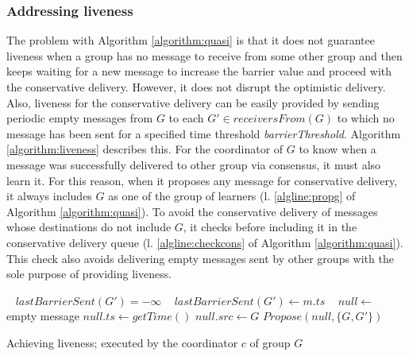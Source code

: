 \documentclass[times, 10pt]{article}
\begin{document}
\subsubsection{Addressing liveness}

The problem with Algorithm \ref{algorithm:quasi} is that it does not guarantee liveness when a group has no message to receive from some other group and then keeps waiting for a new message to increase the barrier value and proceed with the conservative delivery. However, it does not disrupt the optimistic delivery. Also, liveness for the conservative delivery can be easily provided by sending periodic empty messages from $G$ to each $G' \in receiversFrom(G)$ to which no message has been sent for a specified time threshold \textit{barrierThreshold}. Algorithm \ref{algorithm:liveness} describes this. For the coordinator of $G$ to know when a message was successfully delivered to other group via consensus, it must also learn it. For this reason, when it proposes any message for conservative delivery, it always includes $G$ as one of the group of learners (l. \ref{algline:propg} of Algorithm \ref{algorithm:quasi}). To avoid the conservative delivery of messages whose destinations do not include $G$, it checks before including it in the conservative delivery queue (l. \ref{algline:checkcons} of Algorithm \ref{algorithm:quasi}). This check also avoids delivering empty messages sent by other groups with the sole purpose of providing liveness.

\begin{algorithm}
\begin{distribalgo}[1]
\blankline\
    \STATE $lastBarrierSent(G') = -\infty$
  \ENDINDENT
\ENDINDENT
\blankline\
    \STATE $lastBarrierSent(G') \leftarrow m.ts$
  \ENDINDENT
\ENDINDENT
\blankline\
  \STATE $null \leftarrow$ empty message
  \STATE $null.ts \leftarrow getTime()$
  \STATE $null.src \leftarrow G$
  \STATE $Propose(null, \{G,G'\})$
\ENDINDENT
\blankline\

\caption{Achieving liveness; executed by the coordinator $c$ of group $G$}
\label{algorithm:liveness}
\end{distribalgo}
\end{algorithm}
\end{document}
